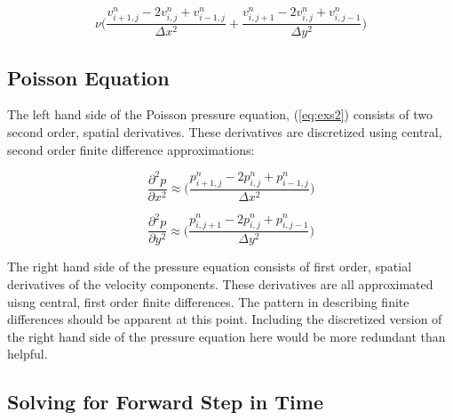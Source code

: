 \documentclass[twocolumn,12pth]{article}
\begin{document}
\begin{equation*}
\nu \Bigg( \frac{v^n_{i+1,j} -2v^n_{i,j} + v^n_{i-1,j}}{\Delta{x^2}} + \frac{v^n_{i,j+1} -2v^n_{i,j} + v^n_{i,j-1}}{\Delta{y^2}} \Bigg)
\end{equation*}

\subsection{Poisson Equation}

The left hand side of the Poisson pressure equation, (\ref{eq:exs2}) consists of two second order, spatial derivatives.
These derivatives are discretized using central, second order finite difference approximations:

\begin{equation}
\frac{\partial^2p}{\partial{x}^2} \approx \Bigg( \frac{p^n_{i+1,j} -2p^n_{i,j} + p^n_{i-1,j}}{\Delta{x^2}} \Bigg)
\end{equation}

\begin{equation*}
\frac{\partial^2p}{\partial{y}^2} \approx \Bigg( \frac{p^n_{i,j+1} -2p^n_{i,j} + p^n_{i,j-1}}{\Delta{y^2}} \Bigg)
\end{equation*}

The right hand side of the pressure equation consists of first order, spatial derivatives of the velocity components.
These derivatives are all approximated uisng central, first order finite differences.
The pattern in describing finite differences should be apparent at this point.
Including the discretized version of the right hand side of the pressure equation here would be more redundant than helpful.

\subsection{Solving for Forward Step in Time}




\nocite{*}

\end{document}
